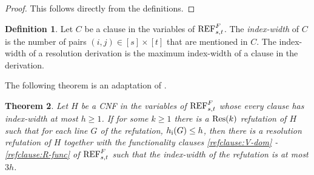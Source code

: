 \documentclass[10pt,a4paper]{article}
\newtheorem{theorem}{Theorem}
\theoremstyle{remark}
\newtheorem*{switching lemma}{Switching Lemma}
\newtheorem*{open problem}{Open Problem}
\theoremstyle{definition}
\newtheorem{definition}[theorem]{Definition}
\begin{document}
\begin{proof}
This follows directly from the definitions.
\end{proof}


\begin{definition}
Let $C$ be a clause in the variables of $\textnormal{REF}^{F}_{s,t}$. The \emph{index-width} of $C$ is the number of  pairs $(i,j) \in [s] \times [t]$ that are mentioned in $C$. The index-width of a resolution derivation is the maximum index-width of a clause in the derivation.
\end{definition}

The following theorem is an adaptation of \cite[Theorem 5.1]{segerlind-buss-impagliazzo}. 

\begin{theorem}
\label{thm:shallow_trees_to_small_width_resolution}
Let $H$ be a CNF in the variables of $\textnormal{REF}^{F}_{s,t}$ whose every clause has index-width at most $h \geq 1$. If for some $k \geq 1$ there is a $\textnormal{Res}(k)$ refutation of $H$ such that for each line $G$ of the refutation, $h_{\textnormal{i}}(G) \leq h$, then there is a resolution refutation of $H$ together with the functionality clauses \eqref{refclause:V-dom} - \eqref{refclause:R-func} of $\textnormal{REF}^{F}_{s,t}$ such that the index-width of the refutation is at most $3h$.
\end{theorem}
\end{document}
